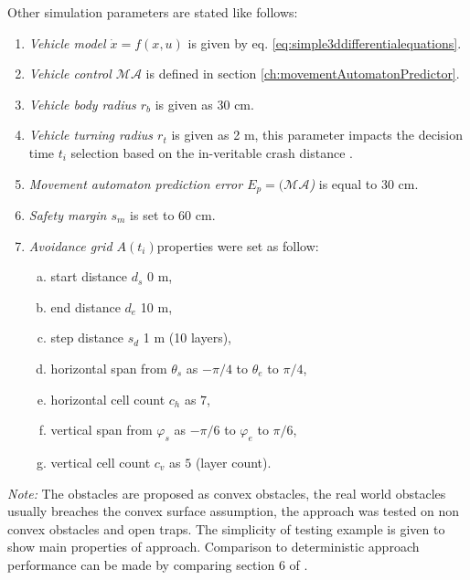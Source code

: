 \noindent Other simulation parameters are stated like follows:
\begin{enumerate}
    \item\emph{Vehicle model $\dot{x}=f(x,u)$} is given by eq. \ref{eq:simple3ddifferentialequations}.
    \item\emph{Vehicle control $\mathscr{MA}$} is defined in section \ref{ch:movementAutomatonPredictor}.
    \item\emph{Vehicle body radius $r_b$} is given as 30 cm.
    \item\emph{Vehicle turning radius $r_t$} is given as 2 m, this parameter impacts the decision time $t_i$ selection based on the in-veritable crash distance \cite{alojzgomola2017}.
    \item\emph{Movement automaton prediction error $E_p=(\mathscr{MA}$)} is equal to 30 cm.
    \item\emph{Safety margin $s_m$} is set to 60 cm.
    \item\emph{Avoidance grid $A(t_i) $}properties were set as follow:
    \begin{enumerate}[a.]
        \item start distance $d_s$ 0 m,
        \item end distance $d_e$ 10 m,
        \item step distance $s_d$ 1 m (10 layers),
        \item horizontal span from $\theta_s$ as $-\pi/4$ to $\theta_e$ to $\pi/4$,
        \item horizontal cell count $c_h$ as $7$,
        \item vertical span from $\varphi_s$ as $-\pi/6$ to $\varphi_e$ to $\pi/6$,
        \item vertical cell count $c_v$ as $5$ (layer count).
    \end{enumerate}
\end{enumerate}

\noindent \emph{Note:} The obstacles are proposed as convex obstacles, the real world obstacles usually breaches the convex surface assumption, the approach was tested on non convex obstacles and open traps. The simplicity of testing example is given to show main properties of approach. Comparison to deterministic approach performance can be made by comparing section 6 of \cite{alojzgomola2017}.


